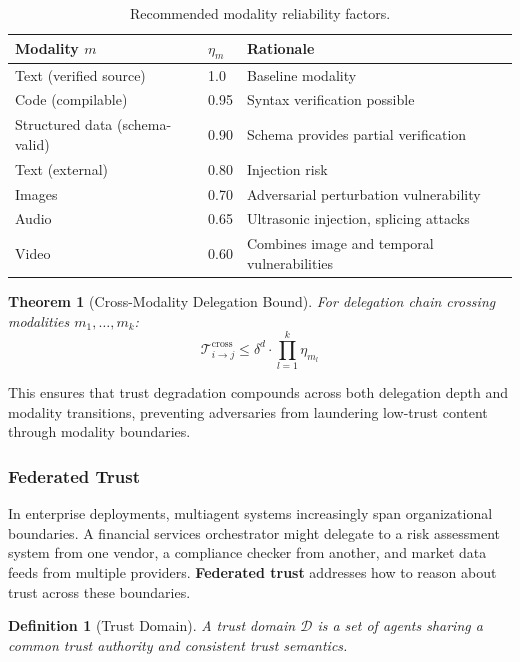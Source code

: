 \documentclass[
]{article}
\newtheorem{definition}{Definition}[section]
\newtheorem{theorem}{Theorem}[section]
\begin{document}
\begin{table}[htbp]
\centering
\caption{Recommended modality reliability factors.}
\label{tab:modality-factors}
\begin{tabular}{@{}llp{5cm}@{}}
\toprule
Modality $m$ & $\eta_m$ & Rationale \\
\midrule
Text (verified source) & 1.0 & Baseline modality \\
Code (compilable) & 0.95 & Syntax verification possible \\
Structured data (schema-valid) & 0.90 & Schema provides partial verification \\
Text (external) & 0.80 & Injection risk \\
Images & 0.70 & Adversarial perturbation vulnerability \\
Audio & 0.65 & Ultrasonic injection, splicing attacks \\
Video & 0.60 & Combines image and temporal vulnerabilities \\
\bottomrule
\end{tabular}
\end{table}

\begin{theorem}[Cross-Modality Delegation Bound]
\label{thm:cross-modality-bound}
For delegation chain crossing modalities $m_1, \ldots, m_k$:
\begin{equation}
\label{eq:cross-modality-bound}
\mathcal{T}_{i \to j}^{\text{cross}} \leq \delta^d \cdot \prod_{l=1}^{k} \eta_{m_l}
\end{equation}
\end{theorem}

This ensures that trust degradation compounds across both delegation
depth and modality transitions, preventing adversaries from laundering
low-trust content through modality boundaries.

\subsubsection{Federated Trust}\label{sec:federated-trust}

In enterprise deployments, multiagent systems increasingly span
organizational boundaries. A financial services orchestrator might
delegate to a risk assessment system from one vendor, a compliance
checker from another, and market data feeds from multiple providers.
\textbf{Federated trust} addresses how to reason about trust across
these boundaries.

\begin{definition}[Trust Domain]
\label{def:trust-domain}
A trust domain $\mathcal{D}$ is a set of agents sharing a common trust authority and consistent trust semantics.
\end{definition}
\end{document}

